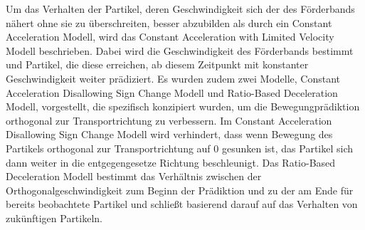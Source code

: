 Um das Verhalten der Partikel, deren Geschwindigkeit sich der des Förderbands nähert ohne sie zu überschreiten, besser abzubilden als durch ein Constant Acceleration Modell,
wird das Constant Acceleration with Limited Velocity Modell beschrieben. 
Dabei wird die Geschwindigkeit des Förderbands bestimmt und Partikel, die diese erreichen, ab diesem Zeitpunkt mit konstanter Geschwindigkeit weiter prädiziert.
Es wurden zudem zwei Modelle, Constant Acceleration Disallowing Sign Change Modell und Ratio-Based Deceleration Modell, vorgestellt, 
die spezifisch konzipiert wurden, um die Bewegungprädiktion orthogonal zur Transportrichtung zu verbessern.
Im Constant Acceleration Disallowing Sign Change Modell wird verhindert, dass wenn Bewegung des Partikels orthogonal zur Transportrichtung auf 0 gesunken ist, das Partikel sich dann weiter in die entgegengesetze Richtung beschleunigt.
Das Ratio-Based Deceleration Modell bestimmt das Verhältnis zwischen der Orthogonalgeschwindigkeit zum Beginn der Prädiktion und zu der am Ende für bereits beobachtete Partikel
und schließt basierend darauf auf das Verhalten von zukünftigen Partikeln.

